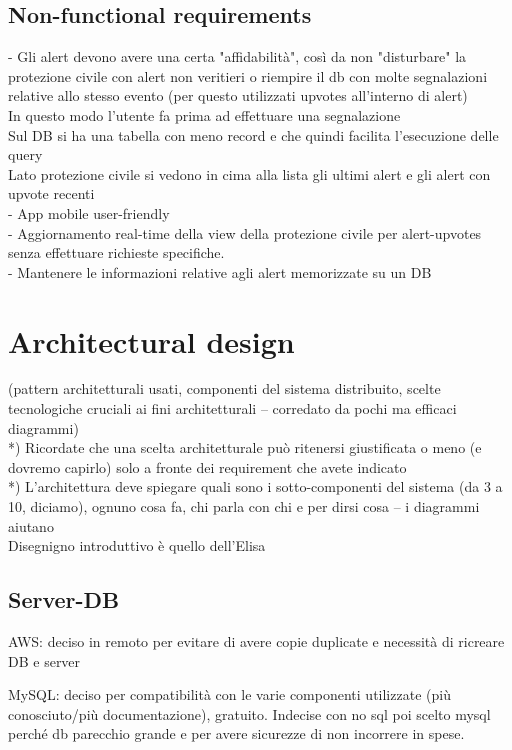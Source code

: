 \documentclass[a4paper,12pt]{report}
\begin{document}
\section{Non-functional requirements}
- Gli alert devono avere una certa "affidabilità", così da non "disturbare" la protezione civile con alert non veritieri o riempire il db con molte segnalazioni relative allo stesso evento (per questo utilizzati upvotes all'interno di alert)\\
In questo modo l'utente fa prima ad effettuare una segnalazione\\
Sul DB si ha una tabella con meno record e che quindi facilita l'esecuzione delle query\\
Lato protezione civile si vedono in cima alla lista gli ultimi alert e gli alert con upvote recenti\\
- App mobile user-friendly\\
- Aggiornamento real-time della view della protezione civile per alert-upvotes senza effettuare richieste specifiche.\\
- Mantenere le informazioni relative agli alert memorizzate su un DB

\chapter{Architectural design}

(pattern architetturali usati, componenti del sistema distribuito, scelte tecnologiche cruciali ai fini architetturali -- corredato da pochi ma efficaci diagrammi)\\

*) Ricordate che una scelta architetturale può ritenersi giustificata o meno (e dovremo capirlo) solo a fronte dei requirement che avete indicato\\

*) L'architettura deve spiegare quali sono i sotto-componenti del sistema (da 3 a 10, diciamo), ognuno cosa fa, chi parla con chi e per dirsi cosa -- i diagrammi aiutano\\

Disegnigno introduttivo è quello dell'Elisa

\section{Server-DB}
AWS: deciso in remoto per evitare di avere copie duplicate e necessità di ricreare DB e server

MySQL: deciso per compatibilità con le varie componenti utilizzate (più conosciuto/più documentazione), gratuito.
Indecise con no sql poi scelto mysql perché db parecchio grande e per avere sicurezze di non incorrere in spese.
\end{document}
